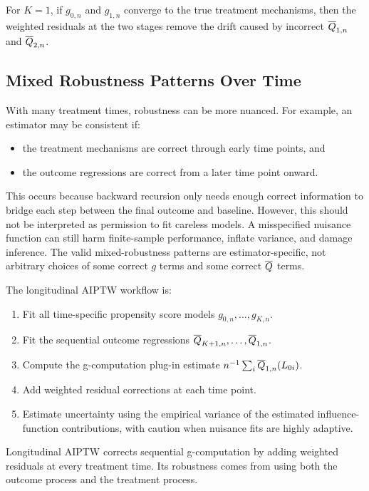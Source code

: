 For $K=1$, if $g_{0,n}$ and $g_{1,n}$ converge to the true treatment mechanisms,
then the weighted residuals at the two stages remove the drift caused by
incorrect $\overline{Q}_{1,n}$ and $\overline{Q}_{2,n}$.

\subsection{Mixed Robustness Patterns Over Time}

With many treatment times, robustness can be more nuanced. For example, an
estimator may be consistent if:
\begin{itemize}
  \item the treatment mechanisms are correct through early time points, and
  \item the outcome regressions are correct from a later time point onward.
\end{itemize}
This occurs because backward recursion only needs enough correct information to
bridge each step between the final outcome and baseline. However, this should
not be interpreted as permission to fit careless models. A misspecified nuisance
function can still harm finite-sample performance, inflate variance, and damage
inference. The valid mixed-robustness patterns are estimator-specific, not
arbitrary choices of some correct $g$ terms and some correct $\overline{Q}$ terms.

\begin{estimationbox}
The longitudinal AIPTW workflow is:
\begin{enumerate}
  \item Fit all time-specific propensity score models $g_{0,n},\ldots,g_{K,n}$.
  \item Fit the sequential outcome regressions
  $\overline{Q}_{K+1,n},\ldots,\overline{Q}_{1,n}$.
  \item Compute the g-computation plug-in estimate
  $n^{-1}\sum_i\overline{Q}_{1,n}(L_{0i})$.
  \item Add weighted residual corrections at each time point.
  \item Estimate uncertainty using the empirical variance of the estimated
  influence-function contributions, with caution when nuisance fits are highly
  adaptive.
\end{enumerate}
\end{estimationbox}

\begin{keyidea}
Longitudinal AIPTW corrects sequential g-computation by adding weighted residuals
at every treatment time. Its robustness comes from using both the outcome
process and the treatment process.
\end{keyidea}
